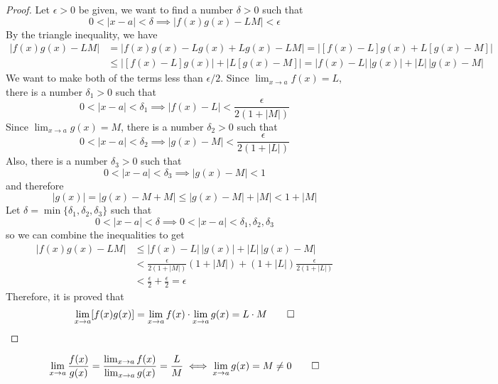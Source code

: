 \begin{proof}
    Let \(\epsilon>0\) be given, we want to find a number \(\delta>0\) such
    that \[0<|x-a|<\delta\implies|f(x)g(x)-LM|<\epsilon\]
    By the triangle inequality, we have
    \begin{align*}
        |f(x)g(x)-LM| &= |f(x)g(x)-Lg(x)+Lg(x)-LM|=|[f(x)-L]g(x)+L[g(x)-M]| \\
        &\leq |[f(x)-L]g(x)|+|L[g(x)-M]|=|f(x)-L|\,|g(x)|+|L|\,|g(x)-M|
    \end{align*}
    We want to make both of the terms less than \(\epsilon/2\).
    Since \(\lim_{x\to a}f(x)=L\), there is a number \(\delta_1>0\) such that
    \[0<|x-a|<\delta_1\implies|f(x)-L|<\frac{\epsilon}{2(1+|M|)}\]
    Since \(\lim_{x\to a}g(x)=M\), there is a number \(\delta_2>0\) such that
    \[0<|x-a|<\delta_2\implies|g(x)-M|<\frac{\epsilon}{2(1+|L|)}\]
    Also, there is a number \(\delta_3>0\) such that
    \[0<|x-a|<\delta_3\implies|g(x)-M|<1\] and therefore
    \[|g(x)|=|g(x)-M+M|\leq|g(x)-M|+|M|<1+|M|\]
    Let \(\delta=\min\{\delta_1,\delta_2,\delta_3\}\) such that
    \[0<|x-a|<\delta\implies0<|x-a|<\delta_1,\delta_2,\delta_3\]
    so we can combine the inequalities to get
    \begin{align*}
        |f(x)g(x)-LM|&\leq|f(x)-L|\,|g(x)|+|L|\,|g(x)-M| \\
        &<\frac{\epsilon}{2(1+|M|)}(1+|M|)+(1+|L|)\frac{\epsilon}{2(1+|L|)} \\
        &<\frac{\epsilon}{2}+\frac{\epsilon}{2}=\epsilon
    \end{align*}
    Therefore, it is proved that
    \[\lim_{x\to a}[f(x)g(x)]=\lim_{x\to a}f(x)\cdot\lim_{x\to a}g(x)
    =L\cdot M\qedhere\]
\end{proof}
\begin{theorem}
    \[\lim_{x\to a}\frac{f(x)}{g(x)}
    =\frac{\lim_{x\to a}f(x)}{\lim_{x\to a}g(x)}
    =\frac{L}{M}\iff\lim_{x\to a}g(x)=M\neq0\qedhere\]
\end{theorem}
